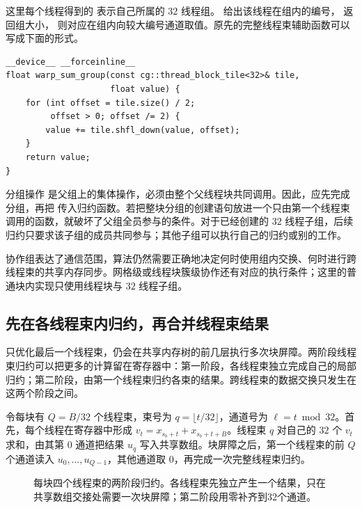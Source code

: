 这里每个线程得到的 \mbox{} 表示自己所属的 $32$ 线程组。\mbox{} 给出该线程在组内的编号，\mbox{} 返回组大小，\mbox{} 则对应在组内向较大编号通道取值。原先的完整线程束辅助函数可以写成下面的形式。

\noindent\begin{minipage}{\linewidth}
\begin{lstlisting}[caption={把参与交换的线程组显式传入归约函数},label={l15:lst:code9}]
__device__ __forceinline__
float warp_sum_group(const cg::thread_block_tile<32>& tile,
                     float value) {
    for (int offset = tile.size() / 2;
         offset > 0; offset /= 2) {
        value += tile.shfl_down(value, offset);
    }
    return value;
}
\end{lstlisting}
\end{minipage}

分组操作 \mbox{} 是父组上的集体操作，必须由整个父线程块共同调用。因此，应先完成分组，再把 \mbox{} 传入归约函数。若把整块分组的创建语句放进一个只由第一个线程束调用的函数，就破坏了父组全员参与的条件。对于已经创建的 $32$ 线程子组，后续归约只要求该子组的成员共同参与；其他子组可以执行自己的归约或别的工作。

协作组表达了通信范围，算法仍然需要正确地决定何时使用组内交换、何时进行跨线程束的共享内存同步。网格级或线程块簇级协作还有对应的执行条件；这里的普通块内实现只使用线程块与 $32$ 线程子组。

\subsection{先在各线程束内归约，再合并线程束结果}

只优化最后一个线程束，仍会在共享内存树的前几层执行多次块屏障。两阶段线程束归约可以把更多的计算留在寄存器中：第一阶段，各线程束独立完成自己的局部归约；第二阶段，由第一个线程束归约各束的结果。跨线程束的数据交换只发生在这两个阶段之间。

令每块有 $Q=B/32$ 个线程束，束号为 $q=\lfloor t/32\rfloor$，通道号为 $\ell=t\bmod32$。首先，每个线程在寄存器中形成 $v_t=x_{s_b+t}+x_{s_b+t+B}$。线程束 $q$ 对自己的 $32$ 个 $v_t$ 求和，由其第 $0$ 通道把结果 $u_q$ 写入共享数组。块屏障之后，第一个线程束的前 $Q$ 个通道读入 $u_0,\ldots,u_{Q-1}$，其他通道取 $0$，再完成一次完整线程束归约。

\begin{figure}[htbp]
\centering

\caption{每块四个线程束的两阶段归约。各线程束先独立产生一个结果，只在共享数组交接处需要一次块屏障；第二阶段用零补齐到32个通道。}
\label{l15:fig:two-stage}
\end{figure}

